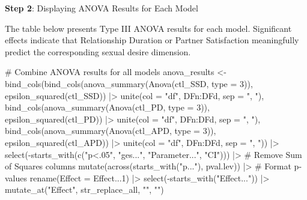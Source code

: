 \documentclass[
  bookmarksnumbered]{article}
\newenvironment{Shaded}{\begin{snugshade}}{\end{snugshade}}
\newcommand{\AttributeTok}[1]{\textcolor[rgb]{0.80,0.80,0.80}{#1}}
\newcommand{\CommentTok}[1]{\textcolor[rgb]{0.50,0.62,0.50}{#1}}
\newcommand{\DecValTok}[1]{\textcolor[rgb]{0.86,0.86,0.80}{#1}}
\newcommand{\FunctionTok}[1]{\textcolor[rgb]{0.94,0.94,0.56}{#1}}
\newcommand{\NormalTok}[1]{\textcolor[rgb]{0.80,0.80,0.80}{#1}}
\newcommand{\OtherTok}[1]{\textcolor[rgb]{0.94,0.94,0.56}{#1}}
\newcommand{\SpecialCharTok}[1]{\textcolor[rgb]{0.86,0.64,0.64}{#1}}
\newcommand{\StringTok}[1]{\textcolor[rgb]{0.80,0.58,0.58}{#1}}
\begin{document}
\textbf{Step 2}: Displaying ANOVA Results for Each Model

The table below presents Type III ANOVA results for each model. Significant effects indicate that Relationship Duration or Partner Satisfaction meaningfully predict the corresponding sexual desire dimension.

\begin{Shaded}
\begin{Highlighting}[]
\CommentTok{\# Combine ANOVA results for all models}
\NormalTok{anova\_results }\OtherTok{\textless{}{-}} \FunctionTok{bind\_cols}\NormalTok{(}\FunctionTok{bind\_cols}\NormalTok{(}\FunctionTok{anova\_summary}\NormalTok{(}\FunctionTok{Anova}\NormalTok{(ctl\_SSD, }\AttributeTok{type =} \DecValTok{3}\NormalTok{)),}
                                     \FunctionTok{epsilon\_squared}\NormalTok{(ctl\_SSD)) }\SpecialCharTok{|\textgreater{}}
                             \FunctionTok{unite}\NormalTok{(}\AttributeTok{col =} \StringTok{"df"}\NormalTok{, DFn}\SpecialCharTok{:}\NormalTok{DFd, }\AttributeTok{sep =} \StringTok{", "}\NormalTok{),}
                           \FunctionTok{bind\_cols}\NormalTok{(}\FunctionTok{anova\_summary}\NormalTok{(}\FunctionTok{Anova}\NormalTok{(ctl\_PD, }\AttributeTok{type =} \DecValTok{3}\NormalTok{)),}
                                     \FunctionTok{epsilon\_squared}\NormalTok{(ctl\_PD)) }\SpecialCharTok{|\textgreater{}}
                             \FunctionTok{unite}\NormalTok{(}\AttributeTok{col =} \StringTok{"df"}\NormalTok{, DFn}\SpecialCharTok{:}\NormalTok{DFd, }\AttributeTok{sep =} \StringTok{", "}\NormalTok{),}
                           \FunctionTok{bind\_cols}\NormalTok{(}\FunctionTok{anova\_summary}\NormalTok{(}\FunctionTok{Anova}\NormalTok{(ctl\_APD, }\AttributeTok{type =} \DecValTok{3}\NormalTok{)),}
                                     \FunctionTok{epsilon\_squared}\NormalTok{(ctl\_APD)) }\SpecialCharTok{|\textgreater{}}
                             \FunctionTok{unite}\NormalTok{(}\AttributeTok{col =} \StringTok{"df"}\NormalTok{, DFn}\SpecialCharTok{:}\NormalTok{DFd, }\AttributeTok{sep =} \StringTok{", "}\NormalTok{)) }\SpecialCharTok{|\textgreater{}}
  \FunctionTok{select}\NormalTok{(}\SpecialCharTok{{-}}\FunctionTok{starts\_with}\NormalTok{(}\FunctionTok{c}\NormalTok{(}\StringTok{"p\textless{}.05"}\NormalTok{, }\StringTok{"ges..."}\NormalTok{, }\StringTok{"Parameter..."}\NormalTok{, }\StringTok{"CI"}\NormalTok{))) }\SpecialCharTok{|\textgreater{}}  \CommentTok{\# Remove Sum of Squares columns}
  \FunctionTok{mutate}\NormalTok{(}\FunctionTok{across}\NormalTok{(}\FunctionTok{starts\_with}\NormalTok{(}\StringTok{"p..."}\NormalTok{), pval.lev)) }\SpecialCharTok{|\textgreater{}} \CommentTok{\# Format p{-}values}
  \FunctionTok{rename}\NormalTok{(}\AttributeTok{Effect =}\NormalTok{ Effect...}\DecValTok{1}\NormalTok{) }\SpecialCharTok{|\textgreater{}} 
  \FunctionTok{select}\NormalTok{(}\SpecialCharTok{{-}}\FunctionTok{starts\_with}\NormalTok{(}\StringTok{"Effect..."}\NormalTok{)) }\SpecialCharTok{|\textgreater{}} 
  \FunctionTok{mutate\_at}\NormalTok{(}\StringTok{"Effect"}\NormalTok{, str\_replace\_all, }\StringTok{"\textasciigrave{}"}\NormalTok{, }\StringTok{""}\NormalTok{)}


\end{Highlighting}
\end{Shaded}
\end{document}
